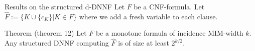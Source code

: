 \begin{frame}[t]{Results on the structured d-DNNF}
	Let $F$ be a CNF-formula. Let $\hat{F} := \{K \cup \{c_K\} | K \in F\}$ where we add a fresh variable to each clause.
	\begin{block}{Theorem (theorem 12)}
		Let $F$ be a monotone formula of incidence MIM-width $k$. Any structured DNNF computing $\hat{F}$ is of size at least $2^{k/2}$.
	\end{block}


\end{frame}
